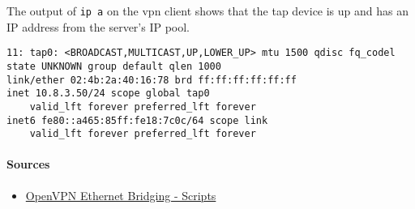 The output of \texttt{ip a} on the vpn client shows that the tap device is up and has an IP address from the server's IP pool.
\begin{verbatim}
11: tap0: <BROADCAST,MULTICAST,UP,LOWER_UP> mtu 1500 qdisc fq_codel state UNKNOWN group default qlen 1000
link/ether 02:4b:2a:40:16:78 brd ff:ff:ff:ff:ff:ff
inet 10.8.3.50/24 scope global tap0
    valid_lft forever preferred_lft forever
inet6 fe80::a465:85ff:fe18:7c0c/64 scope link 
    valid_lft forever preferred_lft forever
\end{verbatim}


\paragraph{Sources}
\begin{itemize}
    \item \href{https://openvpn.net/community-resources/ethernet-bridging/}{OpenVPN Ethernet Bridging - Scripts} 
\end{itemize}
